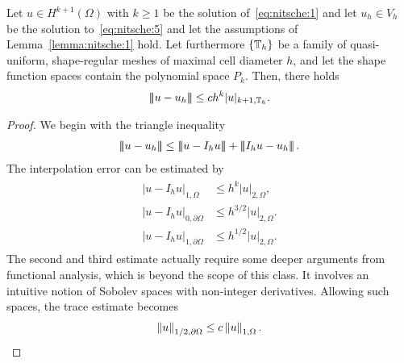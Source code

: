 \begin{theorem}
\label{theorem:nitsche:1}
  Let $u \in H^{k+1}(\Omega)$ with $k\ge 1$ be the solution
  of~\eqref{eq:nitsche:1} and let $u_h\in V_h$ be the solution
  to~\eqref{eq:nitsche:5} and let the assumptions of
  Lemma~\ref{lemma:nitsche:1} hold. Let furthermore $\{\mathbb T_h\}$ be a
  family of quasi-uniform, shape-regular meshes of maximal cell
  diameter $h$, and let the shape function spaces contain the
  polynomial space $P_k$. Then, there holds
  \begin{gather}
    \left|\!\left|\!\left|u-u_h\right|\!\right|\!\right| \le c h^k |u|_{k+1,\mathbb T_h}.
  \end{gather}
\end{theorem}

\begin{proof}
  We begin with the triangle inequality
  \begin{gather*}
    \tnorm{u-u_h} \le \tnorm{u-I_h u} + \tnorm{I_h u-u_h}.
  \end{gather*}
  The interpolation error can be estimated by
  \begin{gather}
    \label{eq:nitsche:7}
    \begin{split}
      \left| u-I_h u\right|_{1,\Omega}
      &\le h^k \left|u\right|_{2,\Omega},
      \\
      \left| u-I_h u\right|_{0,\partial\Omega}
      & \le h^{3/2} \left|u\right|_{2,\Omega}.
      \\
      \left| u-I_h u\right|_{1,\partial\Omega}
      & \le h^{1/2} \left|u\right|_{2,\Omega}.
    \end{split}
  \end{gather}
  The second and third estimate actually require some deeper arguments from
  functional analysis, which is beyond the scope of this class. It
  involves an intuitive notion of Sobolev spaces with non-integer
  derivatives. Allowing such spaces, the trace estimate becomes
  \begin{gather}
    \left\|u\right\|_{1/2, \partial\Omega} \le c \left\|u\right\|_{1,\Omega}.
  \end{gather}


\end{proof}
